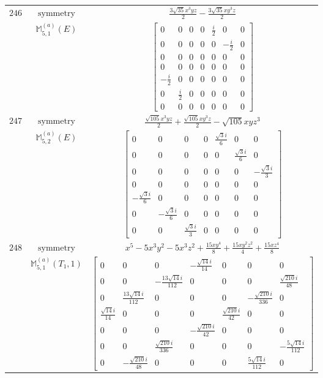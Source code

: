 \documentclass[fleqn,8pt,landscape]{jsarticle}
\begin{document}
\begin{longtable}{ccc}
$ 246 $ & $ \text{symmetry} $ & $ \frac{3 \sqrt{35} x^{3} y z}{2} - \frac{3 \sqrt{35} x y^{3} z}{2} $ \\
$  $ & $ \mathbb{M}_{5,1}^{(a)}(E) $ & $ \begin{bmatrix} 0 & 0 & 0 & 0 & \frac{i}{2} & 0 & 0 \\ 0 & 0 & 0 & 0 & 0 & - \frac{i}{2} & 0 \\ 0 & 0 & 0 & 0 & 0 & 0 & 0 \\ 0 & 0 & 0 & 0 & 0 & 0 & 0 \\ - \frac{i}{2} & 0 & 0 & 0 & 0 & 0 & 0 \\ 0 & \frac{i}{2} & 0 & 0 & 0 & 0 & 0 \\ 0 & 0 & 0 & 0 & 0 & 0 & 0 \end{bmatrix} $ \\ \hline
$ 247 $ & $ \text{symmetry} $ & $ \frac{\sqrt{105} x^{3} y z}{2} + \frac{\sqrt{105} x y^{3} z}{2} - \sqrt{105} x y z^{3} $ \\
$  $ & $ \mathbb{M}_{5,2}^{(a)}(E) $ & $ \begin{bmatrix} 0 & 0 & 0 & 0 & \frac{\sqrt{3} i}{6} & 0 & 0 \\ 0 & 0 & 0 & 0 & 0 & \frac{\sqrt{3} i}{6} & 0 \\ 0 & 0 & 0 & 0 & 0 & 0 & - \frac{\sqrt{3} i}{3} \\ 0 & 0 & 0 & 0 & 0 & 0 & 0 \\ - \frac{\sqrt{3} i}{6} & 0 & 0 & 0 & 0 & 0 & 0 \\ 0 & - \frac{\sqrt{3} i}{6} & 0 & 0 & 0 & 0 & 0 \\ 0 & 0 & \frac{\sqrt{3} i}{3} & 0 & 0 & 0 & 0 \end{bmatrix} $ \\ \hline
$ 248 $ & $ \text{symmetry} $ & $ x^{5} - 5 x^{3} y^{2} - 5 x^{3} z^{2} + \frac{15 x y^{4}}{8} + \frac{15 x y^{2} z^{2}}{4} + \frac{15 x z^{4}}{8} $ \\
$  $ & $ \mathbb{M}_{5,1}^{(a)}(T_{1},1) $ & $ \begin{bmatrix} 0 & 0 & 0 & - \frac{\sqrt{14} i}{14} & 0 & 0 & 0 \\ 0 & 0 & - \frac{13 \sqrt{14} i}{112} & 0 & 0 & 0 & \frac{\sqrt{210} i}{48} \\ 0 & \frac{13 \sqrt{14} i}{112} & 0 & 0 & 0 & - \frac{\sqrt{210} i}{336} & 0 \\ \frac{\sqrt{14} i}{14} & 0 & 0 & 0 & \frac{\sqrt{210} i}{42} & 0 & 0 \\ 0 & 0 & 0 & - \frac{\sqrt{210} i}{42} & 0 & 0 & 0 \\ 0 & 0 & \frac{\sqrt{210} i}{336} & 0 & 0 & 0 & - \frac{5 \sqrt{14} i}{112} \\ 0 & - \frac{\sqrt{210} i}{48} & 0 & 0 & 0 & \frac{5 \sqrt{14} i}{112} & 0 \end{bmatrix} $ \\ \hline

\end{longtable}
\end{document}
